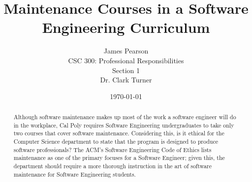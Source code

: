 \documentclass[11pt]{article}
\begin{document}
\title{\vfill Maintenance Courses in a Software Engineering Curriculum} %
\author{
James Pearson \vspace{10pt} \\
CSC 300: Professional Responsibilities  \vspace{10pt} \\
Section 1 \vspace{10pt} \\
Dr. Clark Turner \vspace{10pt} \\
}
\date{\today}

\maketitle

\vfill  %
\begin{abstract}
Although software maintenance makes up most of the work a software engineer will do in the workplace, Cal Poly requires Software Engineering undergraduates to take only two courses that cover software maintenance.  Considering this, is it ethical for the Computer Science department to state that the program is designed to produce software professionals?  The ACM's Software Engineering Code of Ethics lists maintenance as one of the primary focuses for a Software Engineer; given this, the department should require a more thorough instruction in the art of software maintenance for Software Engineering students.
\end{abstract}

\thispagestyle{empty} %
\newpage


\thispagestyle{empty}  %
\tableofcontents

\newpage

\end{document}
